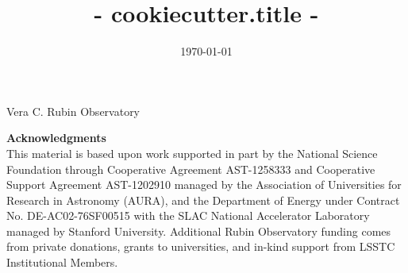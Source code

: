 \documentclass[preprint,12pt]{elsarticle}
\begin{document}
\begin{frontmatter}



\date{\today}
\title{ {{- cookiecutter.title -}} }




\begin{keyword}
Vera C. Rubin Observatory



\end{keyword}

\end{frontmatter}







\textbf{Acknowledgments}\\
This material is based upon work supported in part by the National Science Foundation through Cooperative Agreement AST-1258333 and Cooperative Support Agreement AST-1202910 managed by the Association of Universities for Research in Astronomy (AURA), and the Department of Energy under Contract No. DE-AC02-76SF00515 with the SLAC National Accelerator Laboratory managed by Stanford University.
Additional Rubin Observatory funding comes from private donations, grants to universities, and in-kind support from LSSTC Institutional Members.






\end{document}
